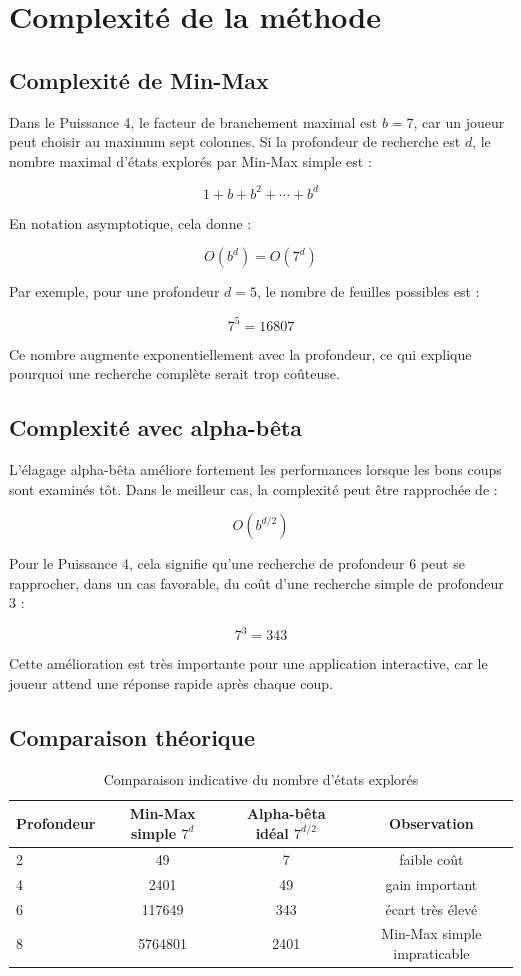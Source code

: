 \documentclass[12pt,a4paper]{article}
\begin{document}
\section{Complexité de la méthode}

\subsection{Complexité de Min-Max}

Dans le Puissance 4, le facteur de branchement maximal est $b = 7$, car un joueur peut choisir au maximum sept colonnes. Si la profondeur de recherche est $d$, le nombre maximal d'états explorés par Min-Max simple est :

\[
    1 + b + b^2 + \cdots + b^d
\]

En notation asymptotique, cela donne :

\[
    O(b^d) = O(7^d)
\]

Par exemple, pour une profondeur $d = 5$, le nombre de feuilles possibles est :

\[
    7^5 = 16807
\]

Ce nombre augmente exponentiellement avec la profondeur, ce qui explique pourquoi une recherche complète serait trop coûteuse.

\subsection{Complexité avec alpha-bêta}

L'élagage alpha-bêta améliore fortement les performances lorsque les bons coups sont examinés tôt. Dans le meilleur cas, la complexité peut être rapprochée de :

\[
    O(b^{d/2})
\]

Pour le Puissance 4, cela signifie qu'une recherche de profondeur $6$ peut se rapprocher, dans un cas favorable, du coût d'une recherche simple de profondeur $3$ :

\[
    7^3 = 343
\]

Cette amélioration est très importante pour une application interactive, car le joueur attend une réponse rapide après chaque coup.

\subsection{Comparaison théorique}

\begin{table}[H]
    \centering
    \begin{tabular}{lccc}
        \toprule
        Profondeur & Min-Max simple $7^d$ & Alpha-bêta idéal $7^{d/2}$ & Observation \\
        \midrule
        2 & 49 & 7 & faible coût \\
        4 & 2401 & 49 & gain important \\
        6 & 117649 & 343 & écart très élevé \\
        8 & 5764801 & 2401 & Min-Max simple impraticable \\
        \bottomrule
    \end{tabular}
    \caption{Comparaison indicative du nombre d'états explorés}
\end{table}
\end{document}
